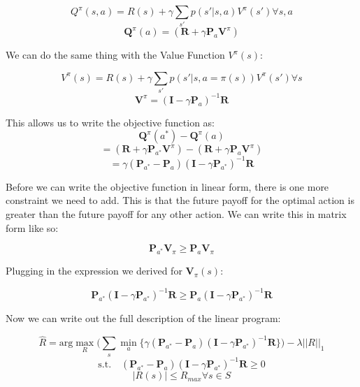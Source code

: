 \documentclass[11pt]{article}
\begin{document}
$$
Q^{\pi}(s,a) = R(s) + \gamma \sum\limits_{s'} p(s' | s,a) V^{\pi}(s') \forall s,a
$$
$$
\textbf{Q}^{\pi}(a) = (\textbf{R} + \gamma \textbf{P}_a \textbf{V}^{\pi})
$$

We can do the same thing with the Value Function $V^{\pi}(s)$:

$$
V^{\pi}(s) = R(s) + \gamma \sum\limits_{s'} p(s' | s,a = \pi(s)) V^{\pi}(s') \forall s
$$
$$
\textbf{V}^{\pi} = (\textbf{I} - \gamma \textbf{P}_a)^{-1} \textbf{R}
$$

This allows us to write the objective function as:
$$
\textbf{Q}^{\pi}(a^*) - \textbf{Q}^{\pi}(a)
$$
$$
= (\textbf{R} + \gamma \textbf{P}_{a^*} \textbf{V}^{\pi})- (\textbf{R} + \gamma \textbf{P}_a \textbf{V}^{\pi})
$$
$$
= \gamma (\textbf{P}_{a^*} - \textbf{P}_{a}) (\textbf{I} - \gamma \textbf{P}_{a^*})^{-1} \textbf{R} 
$$

Before we can write the objective function in linear form, there is one more constraint we need to add. This is that the future payoff for the optimal action is greater than the future payoff for any other action. We can write this in matrix form like so:

$$
\textbf{P}_{a^*} \textbf{V}_{\pi} \geq \textbf{P}_a\textbf{V}_{\pi}
$$

Plugging in the expression we derived for $\textbf{V}_{\pi}(s)$:

$$
\textbf{P}_{a^*} (\textbf{I} - \gamma \textbf{P}_{a^*})^{-1} \textbf{R} \geq \textbf{P}_a (\textbf{I} - \gamma \textbf{P}_{a^*})^{-1} \textbf{R}
$$

Now we can write out the full description of the linear program:

$$
\hat{R} = \text{arg}\max\limits_{R} \Big( \sum\limits_s \min_a \big\{ \gamma (\textbf{P}_{a^*} - \textbf{P}_{a}) (\textbf{I} - \gamma \textbf{P}_{a^*})^{-1} \textbf{R} \big\} \Big) - \lambda ||R||_1
$$
$$
\text{s.t.} \quad (\textbf{P}_{a^*} - \textbf{P}_{a}) (\textbf{I} - \gamma \textbf{P}_{a^*})^{-1} \textbf{R} \geq 0
$$
$$
|R(s)| \leq R_{max} \forall s \in S
$$
\end{document}
